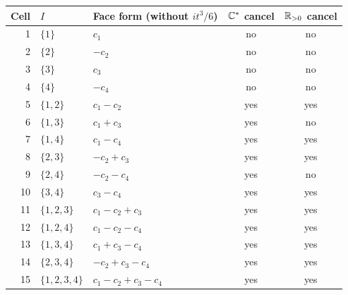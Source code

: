 \begin{longtable}{r l l c c}
\toprule
Cell & $I$ & Face form (without $it^3/6$) & $\mathbb C^*$ cancel & $\mathbb R_{>0}$ cancel\\
\midrule
\endhead
1 & $\{1\}$ & $c_1$ & no & no\\
2 & $\{2\}$ & $-c_2$ & no & no\\
3 & $\{3\}$ & $c_3$ & no & no\\
4 & $\{4\}$ & $-c_4$ & no & no\\
5 & $\{1,2\}$ & $c_1 - c_2$ & yes & yes\\
6 & $\{1,3\}$ & $c_1 + c_3$ & yes & no\\
7 & $\{1,4\}$ & $c_1 - c_4$ & yes & yes\\
8 & $\{2,3\}$ & $-c_2 + c_3$ & yes & yes\\
9 & $\{2,4\}$ & $-c_2 - c_4$ & yes & no\\
10 & $\{3,4\}$ & $c_3 - c_4$ & yes & yes\\
11 & $\{1,2,3\}$ & $c_1 - c_2 + c_3$ & yes & yes\\
12 & $\{1,2,4\}$ & $c_1 - c_2 - c_4$ & yes & yes\\
13 & $\{1,3,4\}$ & $c_1 + c_3 - c_4$ & yes & yes\\
14 & $\{2,3,4\}$ & $-c_2 + c_3 - c_4$ & yes & yes\\
15 & $\{1,2,3,4\}$ & $c_1 - c_2 + c_3 - c_4$ & yes & yes\\
\bottomrule
\end{longtable}
